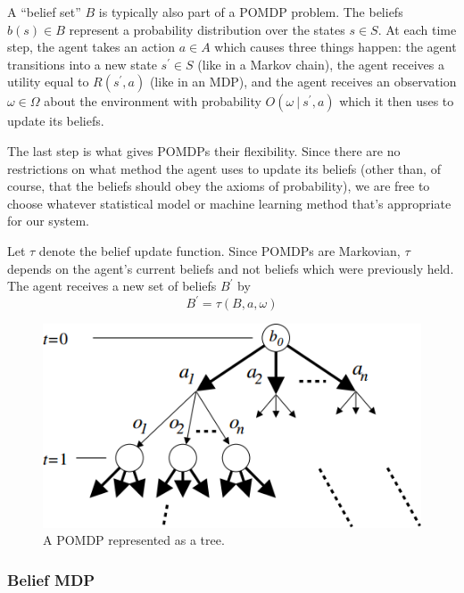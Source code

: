 \documentclass[tog]{acmsiggraph}
\newcommand{\given}[1][]{\:#1\vert\:}
\begin{document}
A ``belief set'' $B$ is typically also part of a POMDP problem. The beliefs $b \left( s \right) \in B$ 
represent a probability distribution over the states $s \in S$. At each time step, 
the agent takes an action $a \in A$ which causes three things happen: the agent transitions 
into a new state $s^\prime \in S$ (like in a Markov chain), the agent receives a utility equal to 
$R \left( s^\prime, a \right)$ (like in an MDP), %
and the agent receives an observation $\omega \in \Omega$ about the environment with probability 
$O \left( \omega \given s^\prime, a \right)$ which it then uses to update its beliefs.

The last step is what gives POMDPs their flexibility. Since there are no restrictions on what method 
the agent uses to update its beliefs (other than, of course, that the beliefs should obey the axioms 
of probability), we are free to choose whatever statistical model or machine learning method that's 
appropriate for our system.

Let $\tau$ denote the belief update function. Since POMDPs are Markovian, $\tau$ depends on the 
agent's current beliefs and not beliefs which were previously held. The agent receives a new set 
of beliefs $B^\prime$ by
\begin{equation} \label{eqn:beliefUpdate}
  B^\prime = \tau \left( B, a, \omega \right)
\end{equation}

\begin{figure}[h]
  \centering
  \includegraphics[scale=0.4]{POMDPtree.png}
  \caption{A POMDP represented as a tree.~\protect\cite{smith2004heuristic}}
  \label{fig:POMDPtree}
\end{figure}

\subsubsection{Belief MDP}
\end{document}
